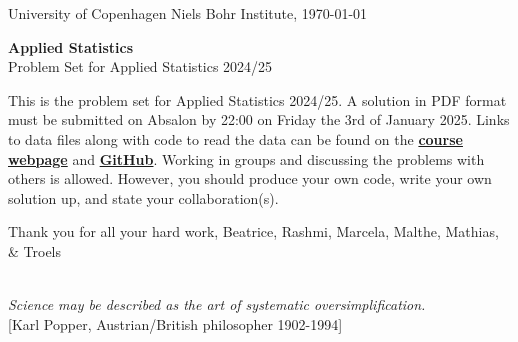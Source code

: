 \documentclass[11pt]{article}
\begin{document}

\noindent
University of Copenhagen \hfill
Niels Bohr Institute, \today \par
\vspace{-2ex}
\noindent
\hrulefill

\vspace{1ex}
\begin{center}
{\bf {\Huge Applied Statistics}}\\
\vspace{1ex}
{\large Problem Set for Applied Statistics 2024/25}
\end{center}

\vspace{0ex}
\noindent
This is the problem set for Applied Statistics 2024/25. A solution in PDF format must be submitted on Absalon by 22:00
on Friday the 3rd of January 2025. Links to data files along with code to read the data can be found on the
  \href{www.nbi.dk/$\sim$petersen/Teaching/AppliedStatistics2024.html}{\bf course webpage} and
  \href{https://github.com/AppliedStatisticsNBI/AppStat2024}{\bf GitHub}.
Working in groups and discussing the problems with others is allowed. However, you should produce your own code,
write your own solution up, and state your collaboration(s).

\begin{center}
  Thank you for all your hard work, Beatrice, Rashmi, Marcela, Malthe, Mathias, \& Troels
\end{center}



\noindent
\hrulefill\\
\emph{Science may be described as the art of systematic oversimplification.}\\
  \phantom{foobar} \hfill [Karl Popper, Austrian/British philosopher 1902-1994]\\[-2ex]

  
\vspace{-2ex}
\noindent
\hrulefill
\end{document}
